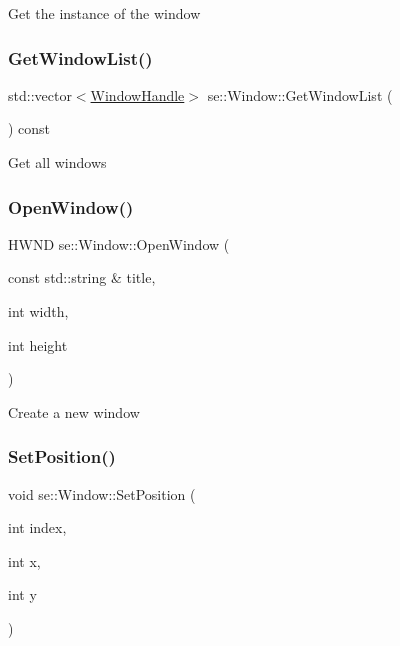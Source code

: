 Get the instance of the window \mbox{\label{classse_1_1_window_a3469863d327e48f06837f772d066e1e7}} 
\subsubsection{\texorpdfstring{Get\+Window\+List()}{GetWindowList()}}
{\footnotesize\ttfamily std\+::vector$<$\mbox{\hyperlink{structse_1_1_window_handle}{Window\+Handle}}$>$ se\+::\+Window\+::\+Get\+Window\+List (\begin{DoxyParamCaption}{ }\end{DoxyParamCaption}) const}

Get all windows \mbox{\label{classse_1_1_window_a0bc98ce202ef1c431fe2780d53dbe7da}} 
\subsubsection{\texorpdfstring{Open\+Window()}{OpenWindow()}}
{\footnotesize\ttfamily H\+W\+ND se\+::\+Window\+::\+Open\+Window (\begin{DoxyParamCaption}\item[{const std\+::string \&}]{title,  }\item[{int}]{width,  }\item[{int}]{height }\end{DoxyParamCaption})}

Create a new window \mbox{\label{classse_1_1_window_a12c371c25615c9d4744a961dab9d949c}} 
\subsubsection{\texorpdfstring{Set\+Position()}{SetPosition()}}
{\footnotesize\ttfamily void se\+::\+Window\+::\+Set\+Position (\begin{DoxyParamCaption}\item[{int}]{index,  }\item[{int}]{x,  }\item[{int}]{y }\end{DoxyParamCaption})}

